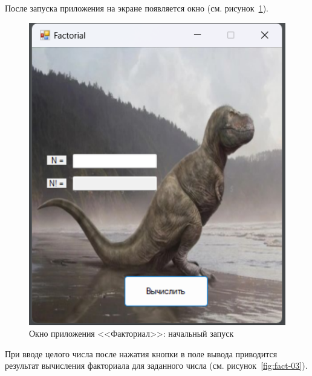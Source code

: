 \documentclass[bachelor, och, pract, times]{SCWorks}
\begin{document}
После запуска приложения на экране появляется окно (см. рисунок~\ref{fig:fact-02}).
\begin{figure}[H]
    \centering
    \includegraphics[scale=0.7]{Скрины/Снимок экрана 2025-01-03 193935.png}
    \caption{Окно приложения <<Факториал>>: начальный запуск}\label{fig:fact-02}
\end{figure}

При вводе целого числа после нажатия кнопки в поле вывода приводится результат вычисления факториала для заданного числа (см. рисунок~\ref{fig:fact-03}).
\end{document}
